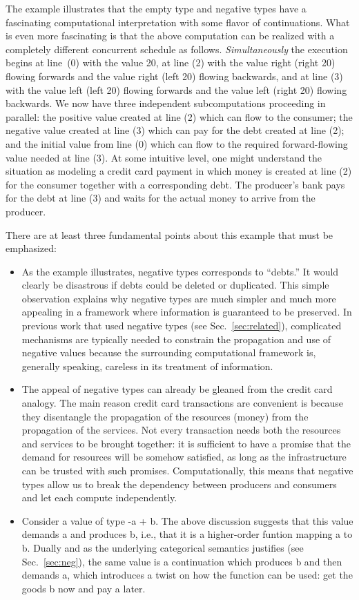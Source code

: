 \documentclass[preprint]{sigplanconf}
\begin{document}
The example illustrates that the empty type and negative types have a
fascinating computational interpretation with some flavor of continuations.
What is even more fascinating is that the above computation can be realized
with a completely different concurrent schedule as
follows. \emph{Simultaneously} the execution begins at line~(0) with the
value {{20}}, at line (2) with the value {{right (right 20)}} flowing forwards
and the value {{right (left 20)}} flowing backwards, and at line (3) with the
value {{left (left 20)}} flowing forwards and the value {{left (right 20)}}
flowing backwards. We now have three independent subcomputations proceeding in
parallel: the positive value created at line (2) which can flow to the
consumer; the negative value created at line (3) which can pay for the debt
created at line (2); and the initial value from line (0) which can flow to
the required forward-flowing value needed at line (3). At some intuitive
level, one might understand the situation as modeling a credit card payment
in which money is created at line (2) for the consumer together with a
corresponding debt. The producer's bank pays for the debt at line (3) and
waits for the actual money to arrive from the producer.

There are at least three fundamental points about this example that must be
emphasized:
\begin{itemize}
\item As the example illustrates, negative types corresponds to ``debts.''
  It would clearly be disastrous if debts could be deleted or
  duplicated. This simple observation explains why negative types are much
  simpler and much more appealing in a framework where information is
  guaranteed to be preserved. In previous work that used negative types (see
  Sec.~\ref{sec:related}), complicated mechanisms are typically needed to
  constrain the propagation and use of negative values because the
  surrounding computational framework is, generally speaking, careless in its
  treatment of information.
\item The appeal of negative types can already be gleaned from the credit
  card analogy. The main reason credit card transactions are convenient is
  because they disentangle the propagation of the resources (money) from the
  propagation of the services. Not every transaction needs both the resources
  and services to be brought together: it is sufficient to have a promise
  that the demand for resources will be somehow satisfied, as long as the
  infrastructure can be trusted with such promises. Computationally, this
  means that negative types allow us to break the dependency between
  producers and consumers and let each compute independently.
\item Consider a value of type {{-a + b}}. The above discussion suggests that
  this value demands {{a}} and produces {{b}}, i.e., that it is a
  higher-order funtion mapping {{a}} to {{b}}. Dually and as the underlying
  categorical semantics justifies (see Sec.~\ref{sec:neg}), the same value is
  a continuation which produces {{b}} and then demands {{a}}, which
  introduces a twist on how the function can be used: get the goods {{b}} now
  and pay {{a}} later.
\end{itemize}
\end{document}
